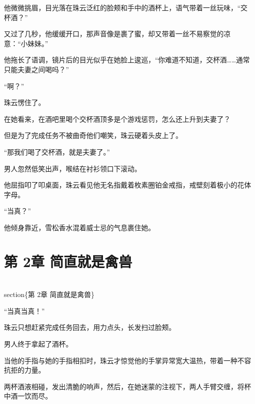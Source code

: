 \documentclass[12pt,a4paper]{article}
\begin{document}
他微微挑眉，目光落在珠云泛红的脸颊和手中的酒杯上，语气带着一丝玩味，“交杯酒？”



又过了几秒，他缓缓开口，那声音像是裹了蜜，却又带着一丝不易察觉的凉意：“小妹妹。”



他拖长了语调，镜片后的目光似乎在她脸上逡巡，“你难道不知道，交杯酒……通常只能夫妻之间喝吗？”



“啊？”



珠云愣住了。



在她看来，在酒吧里喝个交杯酒顶多是个游戏惩罚，怎么还上升到夫妻了？



但是为了完成任务不被曲奇他们嘲笑，珠云硬着头皮上了。



“那我们喝了交杯酒，就是夫妻了。”



男人忽然低笑出声，喉结在衬衫领口下滚动。



他屈指叩了叩桌面，珠云看见他无名指戴着枚素圈铂金戒指，戒壁刻着极小的花体字母。



“当真？”



他倾身靠近，雪松香水混着威士忌的气息裹住她。



\section{第 2章 简直就是禽兽}


\\section\{第 2章 简直就是禽兽\}

“当真当真！”



珠云只想赶紧完成任务回去，用力点头，长发扫过脸颊。



男人终于拿起了酒杯。



当他的手指与她的手指相扣时，珠云才惊觉他的手掌异常宽大温热，带着一种不容抗拒的力量。



两杯酒液相碰，发出清脆的响声，然后，在她迷蒙的注视下，两人手臂交缠，将杯中酒一饮而尽。
\end{document}
